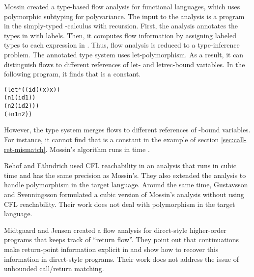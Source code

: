\documentclass{LMCS}
\theoremstyle{definition} \newtheorem{property}[thm]{Property}
\begin{document}
Mossin \cite{diss/diku/96/mossin} created a type-based flow analysis for 
functional languages, which uses poly\-mor\-phic subtyping for polyvariance.
The input to the analysis is a program  in the simply-typed \lam-calculus 
with recursion.
First, the analysis annotates the types in  with labels.
Then, it computes flow information by assigning labeled types to each expression
in .
Thus, flow analysis is reduced to a type-inference problem.
The annotated type system uses let-polymorphism.
As a result, it can distinguish flows to different references of let- and 
letrec-bound variables.
In the following program, it finds that  is a constant.
\begin{center}
  \begin{minipage}{0.35\columnwidth}
    \begin{alltt}
(let* ((id (\lam(x) x))
       (n1 (id 1))
       (n2 (id 2)))
  (+ n1 n2)) \end{alltt}
  \end{minipage}
\end{center}
However, the type system merges flows to different references of \lam-bound
variables.
For instance, it cannot find that  is a constant in the  example
of section \ref{sec:call-ret-mismatch}.
Mossin's algorithm runs in time .

Rehof and F\"ahndrich \cite{conf/popl/01/rehof/typeflow, 
journal/mscs/08/fahndrich/typeflow} used CFL reachability in an analysis that
runs in cubic time and has the same precision as Mossin's.
They also extended the analysis to handle polymorphism in the target language.
Around the same time, Gustavsson and Svenningsson 
\cite{conf/pado/01/gustavsson/constr} formulated a cubic version of Mossin's
analysis without using CFL reachability.
Their work does not deal with polymorphism in the target language.

Midtgaard and Jensen \cite{conf/icfp/09/midtgaard/directCallRet} created 
a flow analysis for direct-style higher-order programs that keeps track of
``return flow''.
They point out that continuations make return-point information explicit
in \cps{} and show how to recover this information in direct-style programs.
Their work does not address the issue of unbounded call/return matching.
\end{document}
